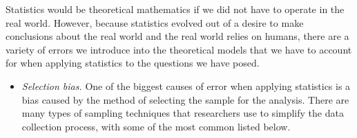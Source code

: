 \documentclass[
]{book}
\theoremstyle{definition}
\theoremstyle{definition}
\theoremstyle{definition}
\theoremstyle{definition}
\theoremstyle{remark}
\begin{document}
Statistics would be theoretical mathematics if we did not have to operate in the real world. However, because statistics evolved out of a desire to make conclusions about the real world and the real world relies on humans, there are a variety of errors we introduce into the theoretical models that we have to account for when applying statistics to the questions we have posed.

\begin{itemize}
\item
  \emph{Selection bias.} One of the biggest causes of error when applying statistics is a bias caused by the method of selecting the sample for the analysis. There are many types of sampling techniques that researchers use to simplify the data collection process, with some of the most common listed below.


\end{itemize}
\end{document}
